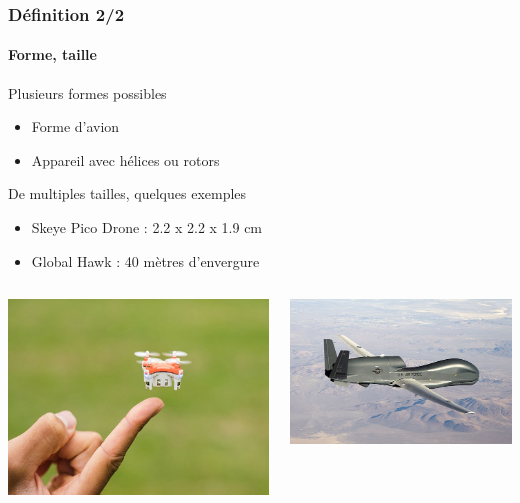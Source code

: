\documentclass{beamer}
\begin{document}
\begin{frame}
  \frametitle{Définition 2/2}
  \framesubtitle{Forme, taille}
  \begin{block}{Plusieurs formes possibles}
    \begin{itemize}
      \item Forme d'avion
      \item Appareil avec hélices ou rotors
    \end{itemize}
  \end{block}
  \begin{block}{De multiples tailles, quelques exemples}
    \begin{itemize}
      \item Skeye Pico Drone : 2.2 x 2.2 x 1.9 cm
      \item Global Hawk : 40 mètres d'envergure
    \end{itemize}
  \end{block}
  \begin{columns}
    \begin{column}{.5\textwidth}
      \includegraphics[width=\textwidth]{../Images/Skeye_Pico.jpg}
    \end{column}
    \begin{column}{.5\textwidth}
      \includegraphics[width=\textwidth]{../Images/global_hawk.jpg}
    \end{column}
  \end{columns}
\end{frame}
\end{document}
